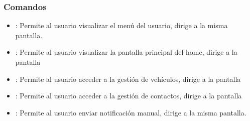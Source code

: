 \subsubsection{Comandos}
    \begin{itemize}
    	
    		\item \btnMenu [Menú]: Permite al usuario visualizar el menú del usuario, dirige a la misma pantalla.
    		\item \btnHome [Home]: Permite al usuario visualizar la pantalla principal del home, dirige a la pantalla 
    		\item \btnVehiculos [Vehículos]: Permite al usuario acceder a la gestión de vehículos, dirige a la pantalla 
    		\item \btnContactos [Contactos]: Permite al usuario acceder a la gestión de contactos, dirige a la pantalla 
    		\item {}: Permite al usuario enviar notificación manual, dirige a la misma pantalla.
    	
    \end{itemize}

%
